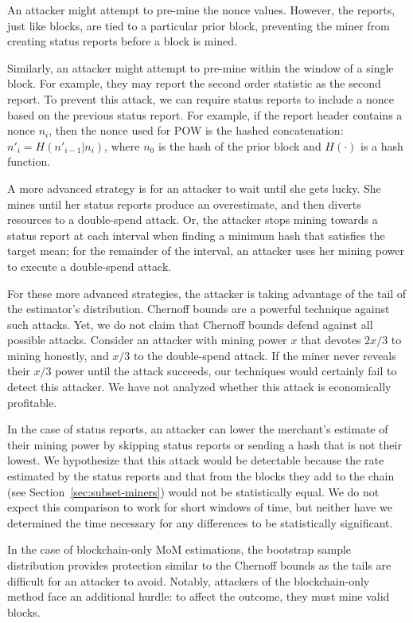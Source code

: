 \documentclass[10pt,sigconf]{acmart}
\newcommand{\para }[1]{\smallskip \noindent {\bf #1}}
\newcommand{\1}{{\em (i)}}
\newcommand{\2}{{\em (ii)}}
\newcommand{\3}{{\em (iii)}}
\newcommand{\4}{{\em (iv)}}
\newcommand{\5}{{\em (v)}}
\begin{document}
\para{Attack analyses.}  
An attacker might attempt to pre-mine the nonce values. However, the reports, just like blocks, are tied to a particular prior block, preventing the miner from creating status reports before a block is mined. 

Similarly, an attacker might attempt to  pre-mine within the window of a single block. For example, they may report the second  order statistic as the second report. To prevent this attack, we can require status reports to include a nonce based on the previous status report. For example, if the report header contains a nonce $n_i$, then the nonce used for POW is the hashed concatenation: $n'_i=H(n'_{i-1}|n_i)$, where $n_0$ is the hash of the prior block and $H(\cdot)$ is a hash function.

A more advanced strategy is for an attacker to wait until she gets lucky. She mines until her status reports produce an overestimate, and then diverts resources to a double-spend attack. Or, the attacker 
 stops mining towards a status report at each interval when finding a minimum hash that satisfies the
 target mean; for the remainder of the interval, an
 attacker uses her mining power to execute a double-spend attack. 

For these more advanced strategies, the attacker is taking advantage of the tail of the estimator's  distribution. Chernoff bounds are a powerful technique against such attacks. 
Yet, we do not claim that Chernoff bounds defend against all possible attacks. Consider an attacker with mining power $x$ that devotes $2x/3$ to mining honestly, and $x/3$ to the double-spend attack. If the miner never reveals their $x/3$ power until the attack succeeds, our techniques would certainly fail to detect this attacker. We have not analyzed whether this attack is economically profitable. 

In the case of status reports, an attacker can lower the merchant's estimate of their mining power by skipping status reports or sending a hash that is not their lowest. We hypothesize that this attack would be detectable because the rate estimated by the status reports and that from the blocks they add to the chain (see Section~\ref{sec:subset-miners}) would not be statistically equal. We do not expect this comparison to work for short windows of time, but neither have we determined the time necessary for any differences to be statistically significant.
 


In the case of blockchain-only MoM estimations, the bootstrap sample distribution provides protection similar to the Chernoff bounds as the tails are difficult for an attacker to avoid. Notably, attackers of the blockchain-only method face an additional hurdle: to affect the outcome, they must mine valid blocks. 
\end{document}
